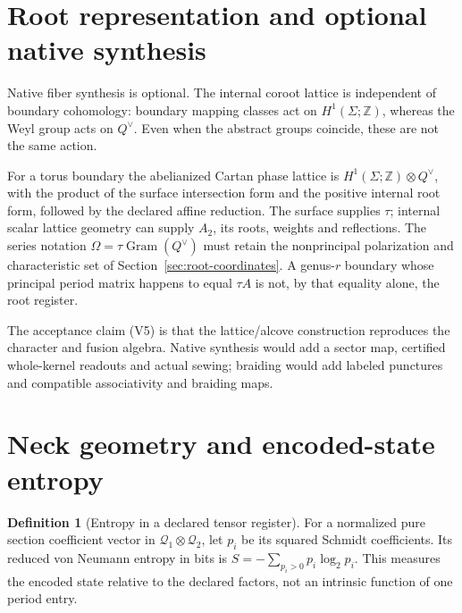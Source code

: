 \documentclass[11pt]{article}
\theoremstyle{definition}
\newtheorem{definition}[theorem]{Definition}
\theoremstyle{remark}
\newcommand{\Z}{\mathbb{Z}}
\begin{document}
\section{Root representation and optional native synthesis}\label{sec:root-program}

Native fiber synthesis is optional. The internal coroot lattice is
independent of boundary
cohomology: boundary mapping classes act on $H^1(\Sigma;\Z)$, whereas
the Weyl group acts on $Q^\vee$. Even when the abstract groups coincide,
these are not the same action.

For a torus boundary the abelianized Cartan phase lattice is
$H^1(\Sigma;\Z)\otimes Q^\vee$, with the product of the surface intersection
form and the positive internal root form, followed by the declared affine
reduction. The surface supplies $\tau$; internal scalar lattice geometry
can supply $A_2$, its roots, weights and reflections. The series notation
$\Omega=\tau\operatorname{Gram}(Q^\vee)$ must retain the nonprincipal
polarization and characteristic set of Section~\ref{sec:root-coordinates}.
A genus-$r$ boundary whose principal period matrix happens to equal
$\tau A$ is not, by that equality alone, the root register.

The acceptance claim (V5) is that the lattice/alcove construction
reproduces the character and fusion algebra. Native synthesis would add a
sector map, certified whole-kernel readouts and actual sewing; braiding
would add labeled punctures and compatible associativity and braiding maps.

\section{Neck geometry and encoded-state entropy}\label{sec:neck-entropy}

\begin{definition}[Entropy in a declared tensor register]
For a normalized pure section coefficient vector in
$\mathcal Q_1\otimes\mathcal Q_2$, let $p_i$ be its squared Schmidt
coefficients. Its reduced von Neumann entropy in bits is
$S=-\sum_{p_i>0}p_i\log_2p_i$. This measures the encoded state relative to
the declared factors, not an intrinsic function of one period entry.
\end{definition}
\end{document}
